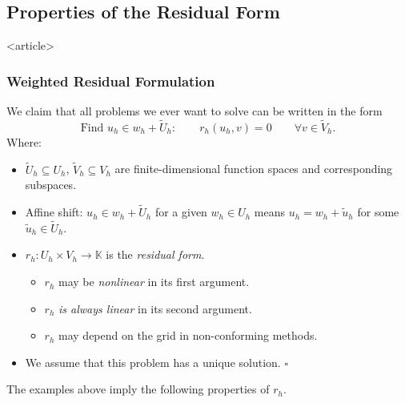 \subsection<article>{Properties of the Residual Form}

\begin{frame}<article>
\frametitle<presentation>{Weighted Residual Formulation}
\begin{Def}
We claim that all problems we ever want to solve can be written in the form
\begin{equation}
\text{Find } u_h\in w_h + \tilde{U}_h : \qquad r_h(u_h,v) =
0 \qquad \forall v\in \tilde{V}_h.
\end{equation}
Where:
\begin{itemize}
\item $\tilde{U}_h\subseteq U_h$, $\tilde{V}_h\subseteq V_h$ are
finite-dimensional function spaces and corresponding subspaces.
\item Affine shift: $u_h\in w_h + \tilde{U}_h$ for a given $w_h\in U_h$ means
$u_h = w_h + \tilde{u}_h$ for some $\tilde{u}_h\in\tilde{U}_h$.
\item $r_h : U_h \times V_h \to \mathbb{K}$ is the \textit{residual form}.
\begin{itemize}
\item $r_h$ may be \textit{nonlinear} in its first argument.
\item $r_h$ \textit{is always linear} in its second argument.
\item $r_h$ may depend on the grid in non-conforming methods.
\end{itemize}
\item We assume that this problem has a unique solution. \hfill$\square$
\end{itemize}
\end{Def}
\end{frame}

The examples above imply the following properties of $r_h$.

